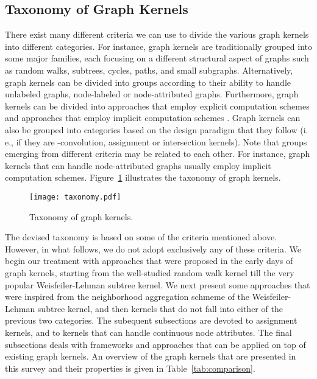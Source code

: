 \documentclass[twoside,11pt]{article}
\newcommand{\ie}{i.\,e., }
\begin{document}
\subsection{Taxonomy of Graph Kernels}
There exist many different criteria we can use to divide the various graph kernels into different categories.
For instance, graph kernels are traditionally grouped into some major families, each focusing on a different structural aspect of graphs such as random walks, subtrees, cycles, paths, and small subgraphs.
Alternatively, graph kernels can be divided into groups according to their ability to handle unlabeled graphs, node-labeled or node-attributed graphs.
Furthermore, graph kernels can be divided into approaches that employ explicit computation schemes and approaches that employ implicit computation schemes .
Graph kernels can also be grouped into categories based on the design paradigm that they follow (\ie if they are -convolution, assignment or intersection kernels).
Note that groups emerging from different criteria may be related to each other.
For instance, graph kernels that can handle node-attributed graphs usually employ implicit computation schemes.
Figure~\ref{fig:taxonomy} illustrates the taxonomy of graph kernels.
\begin{figure}[t]
    \centering
    \texttt{[image: taxonomy.pdf]}
    \caption{Taxonomy of graph kernels.}
    \label{fig:taxonomy}
\end{figure}
The devised taxonomy is based on some of the criteria mentioned above. 
However, in what follows, we do not adopt exclusively any of these criteria.
We begin our treatment with approaches that were proposed in the early days of graph kernels, starting from the well-studied random walk kernel till the very popular Weisfeiler-Lehman subtree kernel.
We next present some approaches that were inspired from the neighborhood aggregation schmeme of the Weisfeiler-Lehman subtree kernel, and then kernels that do not fall into either of the previous two categories.
The subequent subsections are devoted to assignment kernels, and to kernels that can handle continuous node attributes.
The final subsections deals with frameworks and approaches that can be applied on top of existing graph kernels.
An overview of the graph kernels that are presented in this survey and their properties is given in Table~\ref{tab:comparison}.
\end{document}

